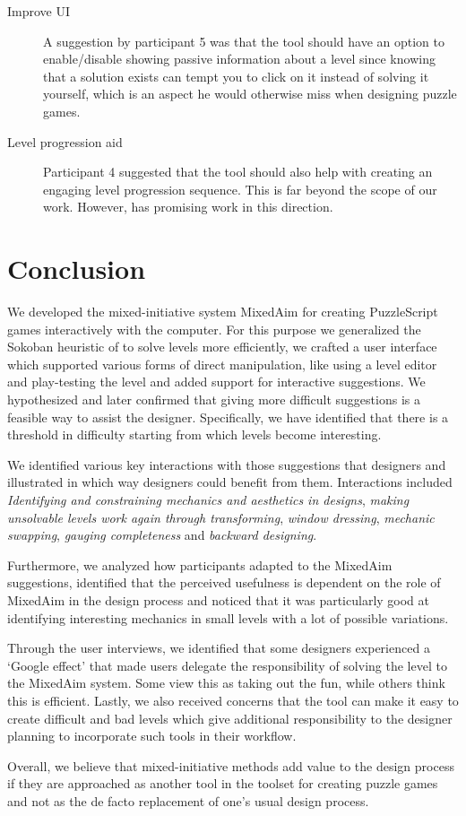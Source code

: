\begin{description}
    \item[Improve UI] A suggestion by participant 5 was that the tool should have an option to enable/disable showing passive information about a level since knowing that a solution exists can tempt you to click on it instead of solving it yourself, which is an aspect he would otherwise miss when designing puzzle games.
     
     \item[Level progression aid] Participant 4 suggested that the tool should also help with creating an engaging level progression sequence. This is far beyond the scope of our work. However, \cite{Butler2013} has promising work in this direction. 
\end{description}

\section{Conclusion}

We developed the mixed-initiative system MixedAim for creating PuzzleScript games interactively with the computer. For this purpose we generalized the Sokoban heuristic of \cite{Junghanns1999} to solve levels more efficiently, we crafted a user interface which supported various forms of direct manipulation, like using a level editor and play-testing the level and added support for interactive suggestions. We hypothesized and later confirmed that giving more difficult suggestions is a feasible way to assist the designer. Specifically, we have identified that there is a threshold in difficulty starting from which levels become interesting.

We identified various key interactions with those suggestions that designers and illustrated in which way designers could benefit from them. Interactions included \textit{Identifying and constraining mechanics and aesthetics in designs}, \textit{making unsolvable levels work again through transforming},  \textit{window dressing}, \textit{mechanic swapping}, \textit{gauging completeness} and \textit{backward designing}.

Furthermore, we analyzed how participants adapted to the MixedAim suggestions, identified that the perceived usefulness is dependent on the role of MixedAim in the design process and noticed that it was particularly good at identifying interesting mechanics in small levels with a lot of possible variations.

Through the user interviews, we identified that some designers experienced a `Google effect' that made users delegate the responsibility of solving the level to the MixedAim system. Some view this as taking out the fun, while others think this is efficient. Lastly, we also received concerns that the tool can make it easy to create difficult and bad levels which give additional responsibility to the designer planning to incorporate such tools in their workflow.

Overall, we believe that mixed-initiative methods add value to the design process if they are approached as another tool in the toolset for creating puzzle games and not as the de facto replacement of one's usual design process.
